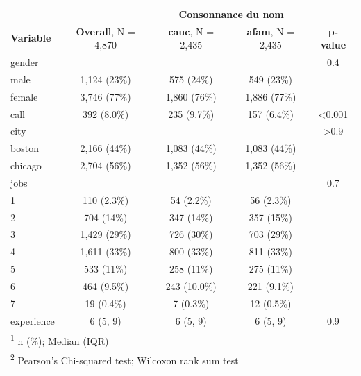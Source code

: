 \documentclass[
  11pt,
]{book}
\numberwithin{equation}{section}
\numberwithin{countremarque}{section}
\begin{document}
\begin{longtable}{lcccc}
\toprule
\multicolumn{2}{c}{ } & \multicolumn{2}{c}{\textbf{Consonnance du nom}} & \multicolumn{1}{c}{ } \\
\cmidrule(l{3pt}r{3pt}){3-4}
\textbf{Variable} & \textbf{Overall}, N = 4,870 & \textbf{cauc}, N = 2,435 & \textbf{afam}, N = 2,435 & \textbf{p-value}\\
\midrule
gender &  &  &  & 0.4\\
\hspace{1em}male & 1,124 (23\%) & 575 (24\%) & 549 (23\%) & \\
\hspace{1em}female & 3,746 (77\%) & 1,860 (76\%) & 1,886 (77\%) & \\
call & 392 (8.0\%) & 235 (9.7\%) & 157 (6.4\%) & <0.001\\
city &  &  &  & >0.9\\
\addlinespace
\hspace{1em}boston & 2,166 (44\%) & 1,083 (44\%) & 1,083 (44\%) & \\
\hspace{1em}chicago & 2,704 (56\%) & 1,352 (56\%) & 1,352 (56\%) & \\
jobs &  &  &  & 0.7\\
\hspace{1em}1 & 110 (2.3\%) & 54 (2.2\%) & 56 (2.3\%) & \\
\hspace{1em}2 & 704 (14\%) & 347 (14\%) & 357 (15\%) & \\
\addlinespace
\hspace{1em}3 & 1,429 (29\%) & 726 (30\%) & 703 (29\%) & \\
\hspace{1em}4 & 1,611 (33\%) & 800 (33\%) & 811 (33\%) & \\
\hspace{1em}5 & 533 (11\%) & 258 (11\%) & 275 (11\%) & \\
\hspace{1em}6 & 464 (9.5\%) & 243 (10.0\%) & 221 (9.1\%) & \\
\hspace{1em}7 & 19 (0.4\%) & 7 (0.3\%) & 12 (0.5\%) & \\
\addlinespace
experience & 6 (5, 9) & 6 (5, 9) & 6 (5, 9) & 0.9\\
\bottomrule
\multicolumn{5}{l}{\rule{0pt}{1em}\textsuperscript{1} n (\%); Median (IQR)}\\
\multicolumn{5}{l}{\rule{0pt}{1em}\textsuperscript{2} Pearson's Chi-squared test; Wilcoxon rank sum test}\\
\end{longtable}
\end{document}
